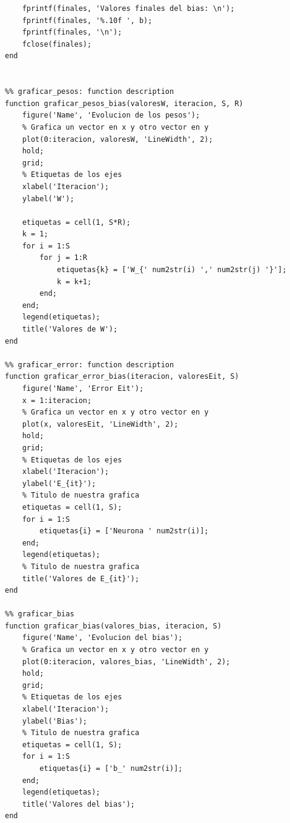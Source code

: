 \documentclass[12pt, titlepage]{article}
\begin{document}
\begin{lstlisting}
    fprintf(finales, 'Valores finales del bias: \n');
    fprintf(finales, '%.10f ', b);
    fprintf(finales, '\n');
    fclose(finales);
end


%% graficar_pesos: function description
function graficar_pesos_bias(valoresW, iteracion, S, R)
    figure('Name', 'Evolucion de los pesos');
    % Grafica un vector en x y otro vector en y
    plot(0:iteracion, valoresW, 'LineWidth', 2); 
    hold;
    grid;
    % Etiquetas de los ejes
    xlabel('Iteracion');
    ylabel('W');
    
    etiquetas = cell(1, S*R);
    k = 1;
    for i = 1:S
        for j = 1:R
            etiquetas{k} = ['W_{' num2str(i) ',' num2str(j) '}'];
            k = k+1;
        end;
    end;
    legend(etiquetas);
    title('Valores de W');
end

%% graficar_error: function description
function graficar_error_bias(iteracion, valoresEit, S)
    figure('Name', 'Error Eit');
    x = 1:iteracion;
    % Grafica un vector en x y otro vector en y
    plot(x, valoresEit, 'LineWidth', 2);
    hold;
    grid;
    % Etiquetas de los ejes
    xlabel('Iteracion');
    ylabel('E_{it}');
    % Titulo de nuestra grafica
    etiquetas = cell(1, S);
    for i = 1:S
        etiquetas{i} = ['Neurona ' num2str(i)];
    end;
    legend(etiquetas);
    % Titulo de nuestra grafica
    title('Valores de E_{it}');
end

%% graficar_bias
function graficar_bias(valores_bias, iteracion, S)
    figure('Name', 'Evolucion del bias');
    % Grafica un vector en x y otro vector en y
    plot(0:iteracion, valores_bias, 'LineWidth', 2); 
    hold;
    grid;
    % Etiquetas de los ejes
    xlabel('Iteracion');
    ylabel('Bias');
    % Titulo de nuestra grafica
    etiquetas = cell(1, S);
    for i = 1:S
        etiquetas{i} = ['b_' num2str(i)];
    end;
    legend(etiquetas);
    title('Valores del bias');
end
        \end{lstlisting}
\end{document}
